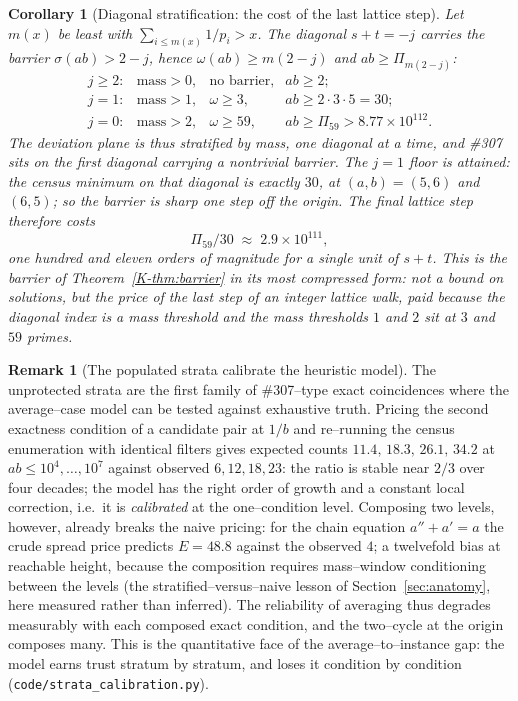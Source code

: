 \documentclass[11pt]{article}
\newtheorem{corollary}[theorem]{Corollary}
\theoremstyle{definition}
\newtheorem{remark}[theorem]{Remark}
\begin{document}
\begin{corollary}[Diagonal stratification: the cost of the last lattice step]\label{cor:diagonals}
Let $m(x)$ be least with $\sum_{i\le m(x)}1/p_i>x$. The diagonal $s+t=-j$ carries the barrier
$\sigma(ab)>2-j$, hence $\omega(ab)\ge m(2-j)$ and $ab\ge\Pi_{m(2-j)}$:
\[
\begin{array}{llll}
j\ge2: & \text{mass}>0, & \text{no barrier}, & ab\ge2;\\
j=1:   & \text{mass}>1, & \omega\ge3,        & ab\ge2\cdot3\cdot5=30;\\
j=0:   & \text{mass}>2, & \omega\ge59,       & ab\ge\Pi_{59}>8.77\times10^{112}.
\end{array}
\]
The deviation plane is thus stratified by mass, one diagonal at a time, and \#307 sits on the first
diagonal carrying a nontrivial barrier. The $j=1$ floor is \emph{attained}: the census minimum on
that diagonal is exactly $30$, at $(a,b)=(5,6)$ and $(6,5)$; so the barrier is sharp one step off
the origin. The final lattice step therefore costs
\[ \Pi_{59}/30\;\approx\;2.9\times10^{111}, \]
one hundred and eleven orders of magnitude for a single unit of $s+t$. This is the barrier of
Theorem~\ref{K-thm:barrier} in its most compressed form: not a bound on solutions, but the price of
the last step of an integer lattice walk, paid because the diagonal index is a mass threshold and
the mass thresholds $1$ and $2$ sit at $3$ and $59$ primes.
\end{corollary}

\begin{remark}[The populated strata calibrate the heuristic model]\label{rem:calibration}
The unprotected strata are the first family of \#307--type exact coincidences where the
average--case model can be tested against exhaustive truth. Pricing the second exactness condition
of a candidate pair at $1/b$ and re--running the census enumeration with identical filters gives
expected counts $11.4,\,18.3,\,26.1,\,34.2$ at $ab\le10^4,\dots,10^7$ against observed
$6,12,18,23$: the ratio is stable near $2/3$ over four decades; the model has the right order of
growth and a constant local correction, i.e.\ it is \emph{calibrated} at the one--condition level.
Composing two levels, however, already breaks the naive pricing: for the chain equation $a''+a'=a$
the crude spread price predicts $E=48.8$ against the observed $4$; a twelvefold bias at
reachable height, because the composition requires mass--window conditioning between the levels
(the stratified--versus--naive lesson of Section~\ref{sec:anatomy}, here measured rather than
inferred). The reliability of averaging thus degrades measurably with each composed exact
condition, and the two--cycle at the origin composes many. This is the quantitative face of the
average--to--instance gap: the model earns trust stratum by stratum, and loses it condition by
condition (\texttt{code/strata\_calibration.py}).
\end{remark}
\end{document}
